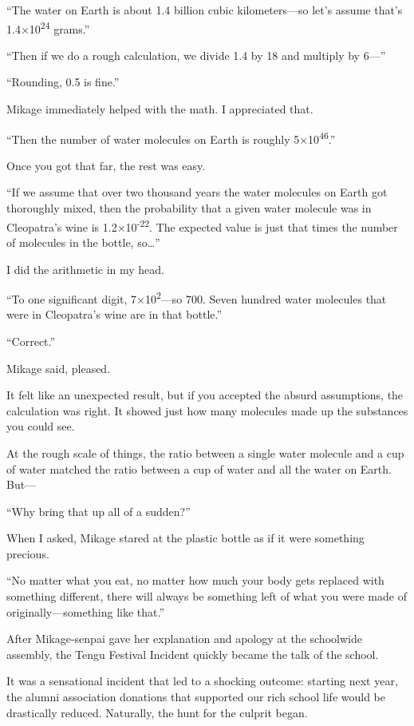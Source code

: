 \documentclass[
    a4paper,
    12pt,
    twoside,
    openany,
    UTF8,
    fontset=windows
]{ctexbook}
\begin{document}
``The water on Earth is about 1.4 billion cubic kilometers---so let's assume that's 1.4×10\textsuperscript{24} grams.''

``Then if we do a rough calculation, we divide 1.4 by 18 and multiply by 6---''

``Rounding, 0.5 is fine.''

Mikage immediately helped with the math. I appreciated that.

``Then the number of water molecules on Earth is roughly 5×10\textsuperscript{46}.''

Once you got that far, the rest was easy.

``If we assume that over two thousand years the water molecules on Earth got thoroughly mixed, then the probability that a given water molecule was in Cleopatra's wine is 1.2×10\textsuperscript{-22}. The expected value is just that times the number of molecules in the bottle, so\dots''

I did the arithmetic in my head.

``To one significant digit, 7×10\textsuperscript{2}---so 700. Seven hundred water molecules that were in Cleopatra's wine are in that bottle.''

``Correct.''

Mikage said, pleased.

It felt like an unexpected result, but if you accepted the absurd assumptions, the calculation was right. It showed just how many molecules made up the substances you could see.

At the rough scale of things, the ratio between a single water molecule and a cup of water matched the ratio between a cup of water and all the water on Earth. But---

``Why bring that up all of a sudden?''

When I asked, Mikage stared at the plastic bottle as if it were something precious.

``No matter what you eat, no matter how much your body gets replaced with something different, there will always be something left of what you were made of originally---something like that.''

After Mikage-senpai gave her explanation and apology at the schoolwide assembly, the Tengu Festival Incident quickly became the talk of the school.

It was a sensational incident that led to a shocking outcome: starting next year, the alumni association donations that supported our rich school life would be drastically reduced. Naturally, the hunt for the culprit began.
\end{document}
